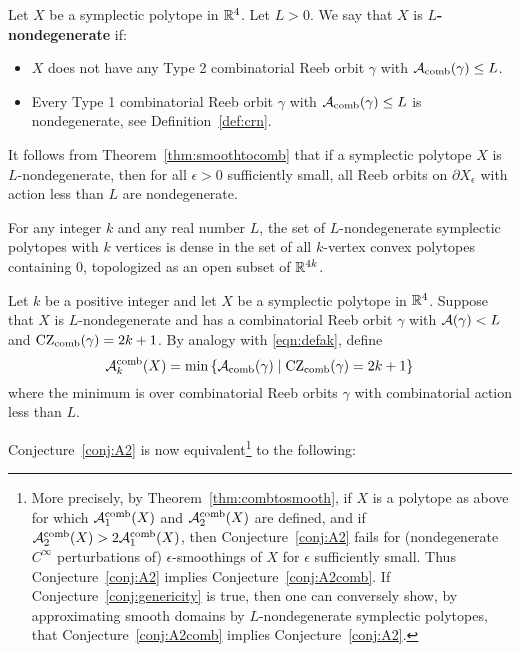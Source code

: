 \begin{definition}
Let $X$ be a symplectic polytope in ${\mathbb R}^4$. Let $L>0$. We say that $X$ is {\bf $L$-nondegenerate\/} if:
\begin{itemize}
	\item $X$ does not have any Type 2 combinatorial Reeb orbit $\gamma$ with ${\mathcal A}_{\operatorname{comb}}(\gamma)\le L$.
	\item Every Type 1 combinatorial Reeb orbit $\gamma$ with ${\mathcal A}_{\operatorname{comb}}(\gamma)\le L$ is nondegenerate, see Definition~\ref{def:crn}.
\end{itemize}
\end{definition}

It follows from Theorem~\ref{thm:smoothtocomb} that if a symplectic polytope $X$ is $L$-nondegenerate, then for all $\epsilon>0$ sufficiently small, all Reeb orbits on $\partial X_\epsilon$ with action less than $L$ are nondegenerate.

\begin{conjecture}
\label{conj:genericity}
For any integer $k$ and any real number $L$, the set of $L$-nondegenerate symplectic polytopes with $k$ vertices is dense in the set of all $k$-vertex convex polytopes containing $0$, topologized as an open subset of ${\mathbb R}^{4k}$.
\end{conjecture}

\begin{definition}
Let $k$ be a positive integer and let $X$ be a symplectic polytope in ${\mathbb R}^4$. Suppose that $X$ is $L$-nondegenerate and has a combinatorial Reeb orbit $\gamma$ with ${\mathcal A}(\gamma)<L$ and $\operatorname{CZ}_{\operatorname{comb}}(\gamma)=2k+1$. By analogy with \eqref{eqn:defak}, define
\[
{\mathcal A}_k^{\operatorname{comb}}(X)=\operatorname{min}\left\{{\mathcal A}_{\operatorname{comb}}(\gamma) \mid \operatorname{CZ}_{\operatorname{comb}}(\gamma) = 2k+1\right\}
\]
where the minimum is over combinatorial Reeb orbits $\gamma$ with combinatorial action less than $L$.
\end{definition}

Conjecture~\ref{conj:A2} is now equivalent\footnote{More precisely, by Theorem~\ref{thm:combtosmooth}, if $X$ is a polytope as above for which ${\mathcal A}_1^{\operatorname{comb}}(X)$ and ${\mathcal A}_2^{\operatorname{comb}}(X)$ are defined, and if
${\mathcal A}_2^{\operatorname{comb}}(X) > 2{\mathcal A}_1^{\operatorname{comb}}(X)$,
then Conjecture~\ref{conj:A2} fails for (nondegenerate $C^\infty$ perturbations of) $\epsilon$-smoothings of $X$ for $\epsilon$ sufficiently small. Thus Conjecture~\ref{conj:A2} implies Conjecture~\ref{conj:A2comb}. If Conjecture~\ref{conj:genericity} is true, then one can conversely show, by approximating smooth domains by $L$-nondegenerate symplectic polytopes, that Conjecture~\ref{conj:A2comb} implies Conjecture~\ref{conj:A2}.} to the following:

